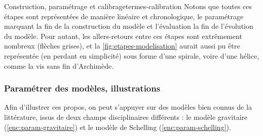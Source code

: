 \begin{encadre}{Construction, paramétrage et calibrage}{termes-calibration}
\medskip
\noindent Notons que toutes ces étapes sont représentées de manière linéaire et chronologique, le paramétrage marquant la fin de la construction du modèle et l'évaluation la fin de l'\og{}évolution\fg{} du modèle.
Pour autant, les allers-retours entre ces étapes sont extrêmement nombreux (flèches grises), et la \cref{fig:etapes-modelisation} aurait aussi pu être représentée (en perdant en simplicité) sous forme d'une spirale, voire d'une hélice, comme la \og vis sans fin\fg{} d'Archimède.

\end{encadre}

\subsubsection{Paramétrer des modèles, illustrations}
Afin d'illustrer ces propos, on peut s'appuyer sur des modèles bien connus de la littérature, issus de deux champs disciplinaires différents : le modèle gravitaire (\cref{enc:param-gravitaire}) et le modèle de Schelling (\cref{enc:param-schelling}).


